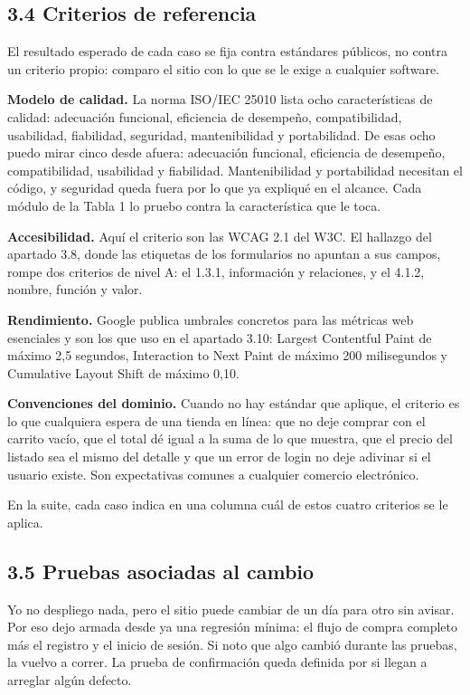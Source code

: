 \documentclass[11pt,a4paper]{article}
\begin{document}
\subsection*{3.4 Criterios de referencia}

El resultado esperado de cada caso se fija contra estándares públicos, no contra un
criterio propio: comparo el sitio con lo que se le exige a cualquier software.

\textbf{Modelo de calidad.} La norma ISO/IEC 25010 lista ocho características de
calidad: adecuación funcional, eficiencia de desempeño, compatibilidad, usabilidad,
fiabilidad, seguridad, mantenibilidad y portabilidad. De esas ocho puedo mirar cinco
desde afuera: adecuación funcional, eficiencia de desempeño, compatibilidad,
usabilidad y fiabilidad. Mantenibilidad y portabilidad necesitan el código, y
seguridad queda fuera por lo que ya expliqué en el alcance. Cada módulo de la
Tabla 1 lo pruebo contra la característica que le toca.

\textbf{Accesibilidad.} Aquí el criterio son las WCAG 2.1 del W3C. El hallazgo del
apartado 3.8, donde las etiquetas de los formularios no apuntan a sus campos, rompe
dos criterios de nivel A: el 1.3.1, información y relaciones, y el 4.1.2, nombre,
función y valor.

\textbf{Rendimiento.} Google publica umbrales concretos para las métricas web
esenciales y son los que uso en el apartado 3.10: Largest Contentful Paint de máximo
2,5 segundos, Interaction to Next Paint de máximo 200 milisegundos y Cumulative
Layout Shift de máximo 0,10.

\textbf{Convenciones del dominio.} Cuando no hay estándar que aplique, el criterio
es lo que cualquiera espera de una tienda en línea: que no deje comprar con el
carrito vacío, que el total dé igual a la suma de lo que muestra, que el precio del
listado sea el mismo del detalle y que un error de login no deje adivinar si el
usuario existe. Son expectativas comunes a cualquier comercio electrónico.

En la suite, cada caso indica en una columna cuál de estos cuatro criterios se le
aplica.

\subsection*{3.5 Pruebas asociadas al cambio}

Yo no despliego nada, pero el sitio puede cambiar de un día para otro sin avisar.
Por eso dejo armada desde ya una regresión mínima: el flujo de compra completo más
el registro y el inicio de sesión. Si noto que algo cambió durante las pruebas, la
vuelvo a correr. La prueba de confirmación queda definida por si llegan a arreglar
algún defecto.
\end{document}
